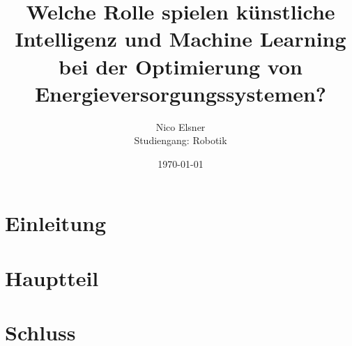 \documentclass[
11pt, 
a4paper,
DIV = 14,
twoside,
twocolumn, %
parskip =half, %
headsepline, %
openright, %
]{scrreprt}
\begin{document}
	
	\title{Welche Rolle spielen künstliche Intelligenz und Machine Learning bei der Optimierung von Energieversorgungssystemen?}
	\author{Nico Elsner\\
		Studiengang: Robotik}
	\date{\today}
	\maketitle
	\tableofcontents
	\thispagestyle{empty}
	
	\chapter{Einleitung}
	\setcounter{page}{1}
	\blindtext
	\chapter{Hauptteil}
	\blindtext
	\chapter{Schluss}
	\blindtext
\end{document}

